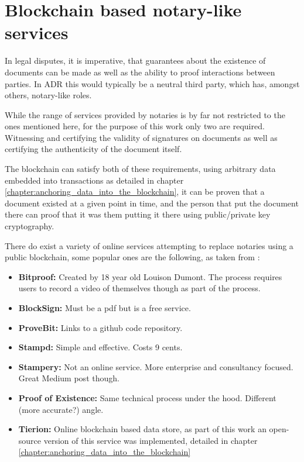 \documentclass[12pt,msc,a4paper,oneside]{ucl_thesis}
\begin{document}
\section{Blockchain based notary-like services}
In legal disputes, it is imperative, that guarantees about the existence of documents can be made as well as the ability to proof interactions between parties. In ADR this would typically be a neutral third party, which has, amongst others, notary-like roles.

While the range of services provided by notaries is by far not restricted to the ones mentioned here, for the purpose of this work only two are required. Witnessing and certifying the validity of signatures on documents as well as certifying the authenticity of the document itself. \cite{notary:does_blockchain_notary_work}

The blockchain can satisfy both of these requirements, using arbitrary data embedded into transactions as detailed in chapter \ref{chapter:anchoring_data_into_the_blockchain}, it can be proven that a document existed at a given point in time, and the person that put the document there can proof that it was them putting it there using public/private key cryptography.

There do exist a variety of online services attempting to replace notaries using a public blockchain, some popular ones are the following, as taken from \cite{notary:does_blockchain_notary_work}:

\begin{itemize}
    \item{\textbf{Bitproof:}} Created by 18 year old Louison Dumont. The process requires users to record a video of themselves though as part of the process.
    \item{\textbf{BlockSign:}} Must be a pdf but is a free service.
    \item{\textbf{ProveBit:}} Links to a github code repository.
    \item{\textbf{Stampd:}} Simple and effective. Costs 9 cents.
    \item{\textbf{Stampery:}} Not an online service. More enterprise and consultancy focused. Great Medium post though.
    \item{\textbf{Proof of Existence:}} Same technical process under the hood. Different (more accurate?) angle.
    \item{\textbf{Tierion:}} Online blockchain based data store, as part of this work an open-source version of this service was implemented, detailed in chapter \ref{chapter:anchoring_data_into_the_blockchain}
\end{itemize}
\end{document}
